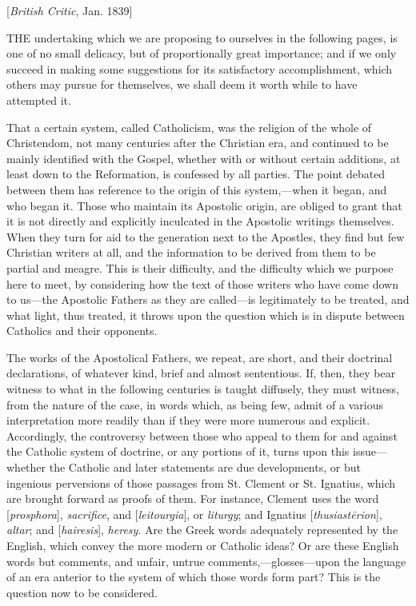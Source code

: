 
[\emph{British Critic}, Jan. 1839]

THE
undertaking which we are proposing to ourselves in the following
pages, is one of no small delicacy, but of proportionally great
importance; and if we only succeed in making some suggestions for its
satisfactory accomplishment, which others may pursue for themselves,
we shall deem it worth while to have attempted it.

That a certain system, called Catholicism, was
the religion of the whole of Christendom, not many centuries after the
Christian era, and continued to be mainly identified with the Gospel,
whether with or without certain additions, at least down to the
Reformation, is confessed by all parties. The point debated between
them has reference to the origin of this system,—when it began, and
who began it. Those who maintain its Apostolic origin, are obliged to
grant that it is not directly and explicitly inculcated in the
Apostolic writings themselves. When they turn for aid to the
generation next to the Apostles, they find but few Christian writers
at all, and the information to be derived from them to be partial and
meagre. This is their difficulty, and the difficulty which we purpose
here to meet, by considering how the text of those writers who have come down to us—the Apostolic Fathers as they are called—is
legitimately to be treated, and what light, thus treated, it throws
upon the question which is in dispute between Catholics and their
opponents.

The works of the Apostolical Fathers, we repeat,
are short, and their doctrinal declarations, of whatever kind, brief
and almost sententious. If, then, they bear witness to what in the
following centuries is taught diffusely, they must witness, from the
nature of the case, in words which, as being few, admit of a various
interpretation more readily than if they were more numerous and
explicit. Accordingly, the controversy between those who appeal to
them for and against the Catholic system of doctrine, or any portions
of it, turns upon this issue—whether the Catholic and later
statements are due developments, or but ingenious perversions of those
passages from St. Clement or St. Ignatius, which are brought forward
as proofs of them. For instance, Clement uses the word [\emph{prosphora}], \emph{sacrifice},
and [\emph{leitourgia}],
or \emph{liturgy}; and Ignatius [\emph{thusiast\={e}rion}], \emph{altar}; and
[\emph{hairesis}], \emph{heresy}. Are the
Greek words adequately represented by the English, which convey the
more modern or Catholic ideas? Or are these English words but
comments, and unfair, untrue comments,—glosses—upon the language
of an era anterior to the system of which those words form part? This
is the question now to be considered.

